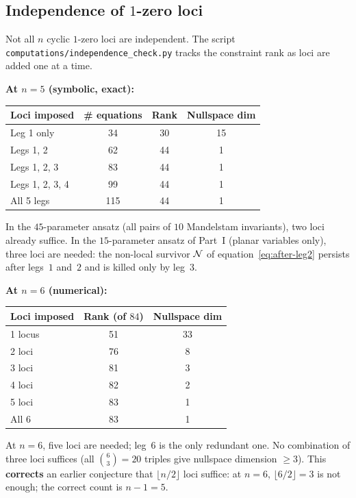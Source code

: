 \subsection{Independence of $1$-zero loci}
\label{ssec:independence}

\begin{remark}
\label{rmk:independence}
Not all $n$ cyclic $1$-zero loci are independent.
The script \texttt{computations/independence\_check.py}
tracks the constraint rank as loci are added one at a time.

\textbf{At $n = 5$ (symbolic, exact):}
\begin{center}
\small
\begin{tabular}{lccc}
\toprule
Loci imposed & \# equations & Rank & Nullspace dim \\
\midrule
Leg 1 only     & 34  & 30 & 15 \\
Legs 1, 2      & 62  & 44 &  1 \\
Legs 1, 2, 3   & 83  & 44 &  1 \\
Legs 1, 2, 3, 4 & 99 & 44 &  1 \\
All 5 legs     & 115 & 44 &  1 \\
\bottomrule
\end{tabular}
\end{center}
In the $45$-parameter ansatz (all pairs of $10$ Mandelstam
invariants), two loci already suffice.
In the $15$-parameter ansatz of Part~I (planar variables only),
three loci are needed: the non-local survivor $\mathcal{N}$ of
equation~\eqref{eq:after-leg2} persists after legs~$1$ and~$2$
and is killed only by leg~$3$.

\textbf{At $n = 6$ (numerical):}
\begin{center}
\small
\begin{tabular}{lcc}
\toprule
Loci imposed & Rank (of $84$) & Nullspace dim \\
\midrule
1 locus   & 51 & 33 \\
2 loci    & 76 &  8 \\
3 loci    & 81 &  3 \\
4 loci    & 82 &  2 \\
5 loci    & 83 &  1 \\
All 6     & 83 &  1 \\
\bottomrule
\end{tabular}
\end{center}
At $n = 6$, five loci are needed; leg~$6$ is the only
redundant one. No combination of three loci suffices
(all $\binom{6}{3} = 20$ triples give nullspace dimension
$\geq 3$). This \textbf{corrects} an earlier conjecture
that $\lfloor n/2 \rfloor$ loci suffice: at $n = 6$,
$\lfloor 6/2 \rfloor = 3$ is not enough; the correct
count is $n - 1 = 5$.
\end{remark}

